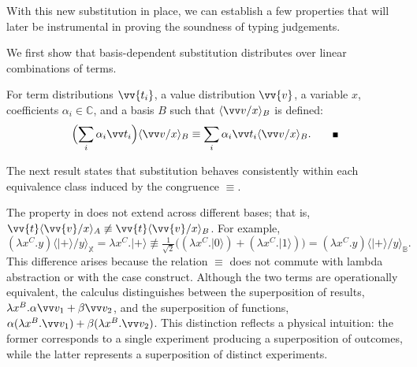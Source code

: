 \documentclass[runningheads,orivec,envcountsame,envcountsect]{llncs}
\providecommand{\qed}{\hbox{\rule{1ex}{1ex}}}%
\newcommand\ket[1]{\ensuremath{|#1\rangle}}
\newcommand\ansubst[2]{\ensuremath{\langle #1 \rangle_{#2}}}
\def\C{\mathbb{C}}            %
\def\Lam#1#2#3{\lambda#1^{#2}{.}#3} %
\newcommand\B{\mathbb B}
\newcommand\XB{\mathbb X}
\begin{document}
With this new substitution in place, we can establish a few properties that
will later be instrumental in proving the soundness of typing judgements.

We first show that basis-dependent substitution distributes over linear
combinations of terms.

\begin{lemma}\label{lem:distributiveSubstitution}
  For term distributions $\vv{t_i}$, a value distribution $\vv{v}$, a
  variable $x$, coefficients $\alpha_i\in\C$, and a basis $B$ such that
  $\ansubst{\vv v/x}{B}$ is defined:
  \[
    \Bigl(\sum_i \alpha_i\vv t_i\Bigr)\ansubst{\vv v/x}{B}
    \equiv
    \sum_i \alpha_i\vv t_i \ansubst{\vv v/x}{B}.
    \tag*{\qed}
  \]
\end{lemma}

The next result states that substitution behaves consistently within each
equivalence class induced by the congruence $\equiv$.


\begin{remark}
  The property in  does not extend across
  different bases; that is,
  $\vv{t}\ansubst{\vv{v}/x}{A}\not\equiv\vv{t}\ansubst{\vv{v}/x}{B}$.
  For example,
  \[
    (\Lam{x}{C}{y})\ansubst{\ket{+}/y}{\XB}
    = \Lam{x}{C}{\ket{+}} 
    \not\equiv
    \tfrac{1}{\sqrt{2}}\big((\Lam{x}{C}{\ket{0}})
    + (\Lam{x}{C}{\ket{1}})\big)
    = (\Lam{x}{C}{y})\ansubst{\ket{+}/y}{\B}.
  \]
  This difference arises because the relation $\equiv$ does not commute with
  lambda abstraction or with the case construct. Although the two terms are
  operationally equivalent, the calculus distinguishes between the
  superposition of results,
  $\Lam{x}{B}{\alpha\vv v_1 + \beta\vv v_2}$,
  and the superposition of functions,
  $\alpha(\Lam{x}{B}{\vv v_1}) + \beta(\Lam{x}{B}{\vv v_2})$.
  This distinction reflects a physical intuition: the former corresponds to a
  single experiment producing a superposition of outcomes, while the latter
  represents a superposition of distinct experiments.
\end{remark}
\end{document}
